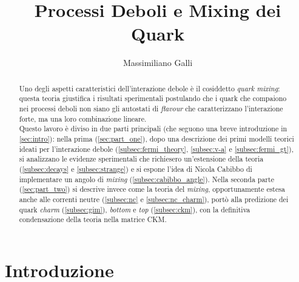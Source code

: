 \documentclass{subnucbo}
\title{Processi Deboli e Mixing dei Quark}
\author{Massimiliano Galli}
\begin{document}
\maketitle

\begin{abstract}
        Uno degli aspetti caratteristici dell'interazione debole è il cosiddetto \textit{quark mixing}: questa teoria giustifica i risultati sperimentali postulando che i quark che compaiono nei processi deboli non siano gli autostati di \textit{flavour} che caratterizzano l'interazione forte, ma una loro combinazione lineare. \\
        Questo lavoro è diviso in due parti principali (che seguono una breve introduzione in \ref{sec:intro}): nella prima (\ref{sec:part_one}), dopo una descrizione dei primi modelli teorici ideati per l'interazione debole (\ref{subsec:fermi_theory}, \ref{subsec:v-a} e \ref{subsec:fermi_gt}), si analizzano le evidenze sperimentali che richiesero un'estensione della teoria (\ref{subsec:decays} e \ref{subsec:strange}) e si espone l'idea di Nicola Cabibbo di implementare un angolo di \textit{mixing} (\ref{subsec:cabibbo_angle}).
        Nella seconda parte (\ref{sec:part_two}) si descrive invece come la teoria del \textit{mixing}, opportunamente estesa anche alle correnti neutre (\ref{subsec:nc} e \ref{subsec:nc_charm}), portò alla predizione dei quark \textit{charm} (\ref{subsec:gim}), \textit{bottom} e \textit{top} (\ref{subsec:ckm}), con la definitiva condensazione della teoria nella matrice CKM.
\end{abstract}

\section{Introduzione}
\label{sec:intro}
\end{document}
